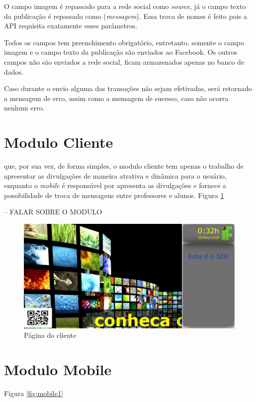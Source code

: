 O campo imagem é repassado para a rede social como \textit{source}, já o campo texto da publicação é repassado como (\textit{messagem}). Essa troca de nomes é feito pois a API requisita exatamente esses parâmetros.

Todos os campos tem preenchimento obrigatório, entretanto, somente o campo imagem e o campo texto da publicação são enviados ao Facebook. Os outros campos não são enviados a rede social, ficam armazenados apenas no banco de dados.

Caso durante o envio alguma das transações não sejam efetivadas, será retornado a mensagem de erro, assim como a mensagem de sucesso, caso não ocorra nenhum erro.

\section{Modulo Cliente}
que, por sua vez, de forma simples, o modulo cliente tem apenas o trabalho de apresentar as divulgações de maneira atrativa e dinâmica para o usuário, enquanto o \textit{mobile} é responsável por apresenta as divulgações e fornece a possibilidade de troca de mensagens entre professores e alunos. 
Figura \ref{fig:cliente1}

-- FALAR SOBRE O MODULO

\begin{figure}[H]
\centering
\includegraphics[scale=0.4]{figuras/cliente1}
\caption{Página do cliente}
\label{fig:cliente1}
\end{figure}


\section{Modulo Mobile}
Figura \ref{fig:mobile1}

 
